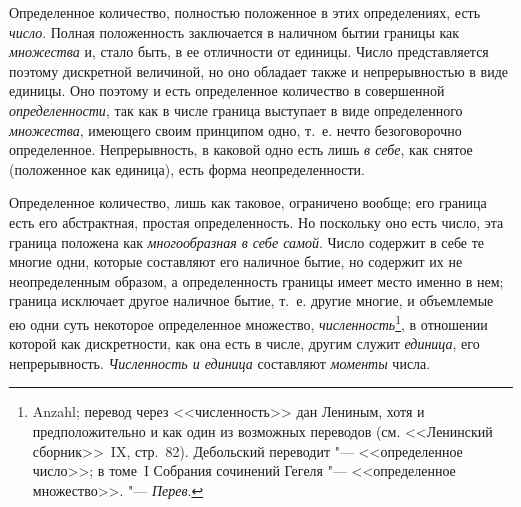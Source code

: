 Определенное количество, полностью положенное в этих определениях, есть
{\em число}. Полная положенность заключается в наличном
бытии границы как {\em множества} и, стало быть, в ее
отличности от единицы. Число представляется поэтому дискретной величиной,
но оно обладает также и непрерывностью в виде единицы. Оно поэтому и есть
определенное количество в совершенной
{\em определенности}, так как в числе граница выступает
в виде определенного {\em множества}, имеющего своим
принципом одно, т.~е. нечто безоговорочно определенное. Непрерывность,
в каковой одно есть лишь {\em в себе}, как снятое
(положенное как единица), есть форма неопределенности.

Определенное количество, лишь как таковое, ограничено вообще; его граница
есть его абстрактная, простая определенность. Но поскольку оно есть число,
эта граница положена как {\em многообразная в себе
самой}. Число содержит в себе те многие одни, которые составляют его
наличное бытие, но содержит их не неопределенным образом, а определенность
границы имеет место именно в нем; граница исключает другое наличное
бытие, т.~е. другие многие, и объемлемые ею одни суть некоторое
определенное множество, {\em численность}\footnote{Anzahl;
перевод через <<численность>> дан Лениным, хотя и
предположительно и как один из возможных переводов (см.
<<Ленинский сборник>>~IX, стр.~82). Дебольский переводит "---
<<определенное число>>; в томе~I Собрания сочинений
Гегеля "--- <<определенное множество>>. "--- {\em Перев}.},
в отношении которой как дискретности, как она есть в числе, другим служит
{\em единица}, его непрерывность. {\em Численность и единица} составляют
{\em моменты} числа.


